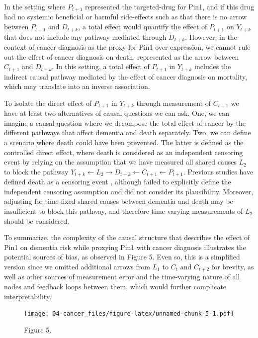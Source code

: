 \documentclass[
]{book}
\begin{document}
In the setting where \(P_{t+1}\) represented the targeted-drug for Pin1, and if this drug had no systemic beneficial or harmful side-effects such as that there is no arrow between \(P_{t+1}\) and \(D_{t+k}\), a total effect would quantify the effect of \(P_{t+1}\) on \(Y_{t+k}\) that does not include any pathway mediated through \(D_{t+k}\)\autocite{young2020}. However, in the context of cancer diagnosis as the proxy for Pin1 over-expression, we cannot rule out the effect of cancer diagnosis on death, represented as the arrow between \(C_{t+1}\) and \(D_{t+k}\). In this setting, a total effect of \(P_{t+1}\) in \(Y_{t+k}\) includes the indirect causal pathway mediated by the effect of cancer diagnosis on mortality, which may translate into an inverse association\autocite{young2020}.

To isolate the direct effect of \(P_{t+1}\) in \(Y_{t+k}\) through measurement of \(C_{t+1}\) we have at least two alternatives of causal questions we can ask. One, we can imagine a causal question where we decompose the total effect of cancer by the different pathways that affect dementia and death separately\autocite{stensrud2020}. Two, we can define a scenario where death could have been prevented. The latter is defined as the controlled direct effect, where death is considered as an independent censoring event by relying on the assumption that we have measured all shared causes \(L_2\) to block the pathway \(Y_{t+k} \leftarrow L_2 \rightarrow D_{t+k} \leftarrow C_{t+1} \leftarrow P_{t+1}\). Previous studies have defined death as a censoring event \autocite{frain2017}, although failed to explicitly define the independent censoring assumption and did not consider its plausibility. Moreover, adjusting for time-fixed shared causes between dementia and death may be insufficient to block this pathway, and therefore time-varying measurements of \(L_2\) should be considered.

To summarize, the complexity of the causal structure that describes the effect of Pin1 on dementia risk while proxying Pin1 with cancer diagnosis illustrates the potential sources of bias, as observed in Figure 5. Even so, this is a simplified version since we omitted additional arrows from \(L_1\) to \(C_t\) and \(C_{t+2}\) for brevity, as well as other sources of measurement error and the time-varying nature of all nodes and feedback loops between them, which would further complicate interpretability\autocite{whatif2020}.

\begin{figure}
\centering
\texttt{[image: 04-cancer\_files/figure-latex/unnamed-chunk-5-1.pdf]}
\caption{\label{fig:unnamed-chunk-5}Figure 5.}
\end{figure}
\end{document}
